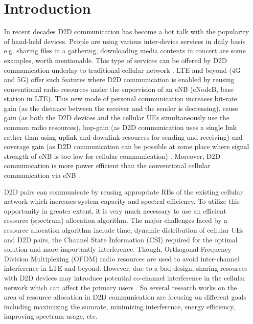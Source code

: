 \documentclass[times]{dacauth}
\begin{document}
\maketitle



\vspace{-6pt}

\section{Introduction}\label{section:Introduction}
\vspace {-0.1cm}
\noindent
In recent decades D2D communication has become a hot talk with the popularity of hand-held devices. People are using various inter-device services in daily basis e.g. sharing files in a gathering, downloading media contents in concert are some examples, worth mentionable. This type of services can be offered by D2D communication underlay to traditional cellular network \cite{doppler2009device}. LTE and beyond (4G and 5G) offer such features where D2D communication is enabled by reusing conventional radio resources under the supervision of an eNB (eNodeB, base station in LTE). This new mode of personal communication increases bit-rate gain (as the distance between the receiver and the sender is decreasing), reuse gain (as both the D2D devices and the cellular UEs simultaneously use the common radio resources), hop-gain (as D2D communication uses a single link rather than using uplink and downlink resources for sending and receiving) and coverage gain (as D2D communication can be possible at some place where signal strength of eNB is too low for cellular communication) \cite{fodor}. Moreover, D2D communication is more power efficient than the conventional cellular communication via eNB \cite{stefania}.
 
\smallskip
\noindent 
D2D pairs can communicate by reusing appropriate RBs of the existing cellular network which increases system capacity and spectral efficiency. To utilize this opportunity in greater extent, it is very much necessary to use an efficient resource (spectrum) allocation algorithm. The major challenges faced by a resource allocation algorithm include time, dynamic distribution of cellular UEs and D2D pairs, the Channel State Information (CSI) required for the optimal solution and more importantly interference. Though, Orthogonal Frequency Division Multiplexing (OFDM) radio resources are used to avoid inter-channel interference in LTE and beyond. However, due to a bad design, sharing resources with D2D devices may introduce potential co-channel interference in the cellular network which can affect the primary users  \cite{asadi2014survey, min}. So several research works on the area of resource allocation in D2D communication are focusing on different goals including maximizing the sumrate, minimizing interference, energy efficiency, improving spectrum usage, etc.
\end{document}
